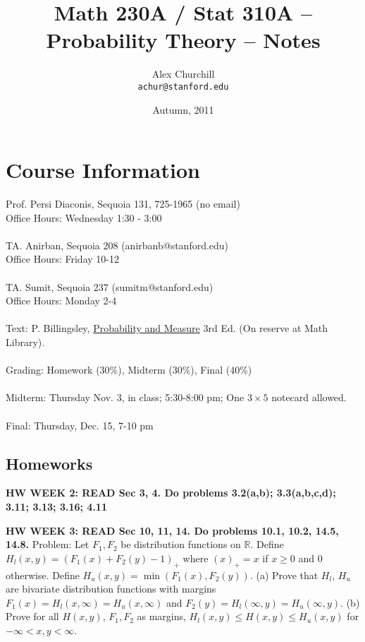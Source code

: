 \documentclass[12pt]{article}
\title{Math 230A / Stat 310A -- Probability Theory -- Notes}
\author{
Alex Churchill\\
\small \texttt{achur@stanford.edu}
}
\date{Autumn, 2011}
\begin{document}
\maketitle
\thispagestyle{empty} %
\tableofcontents


\newpage

\setcounter{page}{1} %

\section{Course Information}
Prof. Persi Diaconis, Sequoia 131, 725-1965 (no email) \\
Office Hours: Wednesday 1:30 - 3:00
\\ \\
TA. Anirban, Sequoia 208 (anirbanb@stanford.edu) \\
Office Hours: Friday 10-12
\\ \\
TA. Sumit, Sequoia 237 (sumitm@stanford.edu) \\
Office Hours: Monday 2-4
\\ \\
Text: P. Billingsley, \underline{Probability and Measure} 3rd Ed. (On reserve at Math Library).
\\ \\
Grading: Homework (30\%), Midterm (30\%), Final (40\%)
\\ \\
Midterm: Thursday Nov. 3, in class; 5:30-8:00 pm; One $3 \times 5$ notecard allowed.
\\ \\
Final: Thursday, Dec. 15, 7-10 pm

\subsection{Homeworks}

{\bf HW WEEK 2: READ Sec 3, 4.  Do problems 3.2(a,b); 3.3(a,b,c,d); 3.11; 3.13; 3.16; 4.11}

{\bf HW WEEK 3: READ Sec 10, 11, 14.  Do problems 10.1, 10.2, 14.5, 14.8.}
Problem: Let $F_1, F_2$ be distribution functions on $\mathbb{R}$.  Define $H_l(x,y) = (F_1(x) + F_2(y) - 1)_+$ where $(x)_+ = x$ if $x \ge 0$ and $0$ otherwise.  Define $H_u(x,y) = \min(F_1(x), F_2(y))$.  (a) Prove that $H_l$, $H_u$ are bivariate distribution functions with margins $F_1(x) = H_l(x, \infty) = H_u(x, \infty)$ and $F_2(y) = H_l(\infty, y) = H_u(\infty, y)$. (b) Prove for all $H(x,y)$, $F_1, F_2$ as margins, $H_l(x,y) \le H(x,y) \le H_u(x,y)$ for $-\infty < x,y < \infty$.
\end{document}
